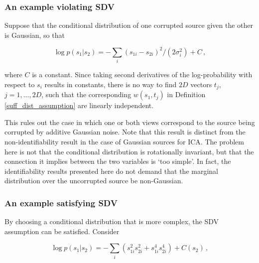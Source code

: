 
\subsubsection{An example violating SDV}

Suppose that the conditional distribution of one corrupted source given the other is Gaussian, so that

\begin{equation}
\log p(s_1|s_2) =  -\sum_i (s_{1i} - s_{2i})^2/(2\sigma_i^2) + C \,, \label{eq:unsatisfied}
\end{equation}

where $C$ is a constant.
Since taking second derivatives of the log-probability with respect to $s_i$ results in constants,
there is no way to find $2D$ vectors ${t}_j$, $j=1, \ldots, 2D$, such that the corresponding ${w}(s_1, t_j)$ in Definition \ref{suff_dist_assumption} are linearly independent.

This rules out the case in which one or both views correspond to the source being corrupted by additive Gaussian noise.
Note that this result is distinct from the non-identifiability result in the case of Gaussian sources for ICA.
The problem here is not that the conditional distribution is rotationally invariant, but that the connection it implies between the two variables is `too simple'.
In fact, the identifiability results presented here do not demand that the marginal distribution over the uncorrupted source be non-Gaussian.



\subsubsection{An example satisfying SDV}

By choosing a conditional distribution  that is more complex, the SDV assumption can be satisfied. Consider

\begin{equation}
\log p(s_1|s_2) =  - \sum_i (s_{1i}^2  s_{2i}^2 + s_{1i}^4 s_{2i}^4  ) + C(s_2) \,, \label{eq:satisfied}
\end{equation}

